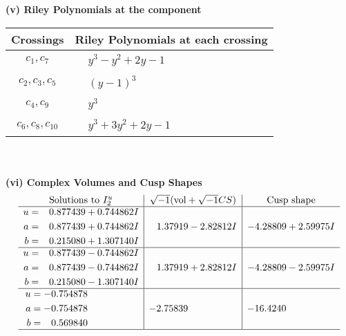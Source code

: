 \documentclass[1p]{elsarticle_modified}
\theoremstyle{definition}
\newcommand{\I}{\sqrt{-1}}
\begin{document}
\flushleft \textbf{(v) Riley Polynomials at the component}\newline \\
\begin{tabular}{m{50pt}|m{274pt}}
Crossings & \hspace{64pt}Riley Polynomials at each crossing \\
\hline $$\begin{aligned}c_{1},c_{7}\end{aligned}$$&$\begin{aligned}
&y^3- y^2+2 y-1
\end{aligned}$\\
\hline $$\begin{aligned}c_{2},c_{3},c_{5}\end{aligned}$$&$\begin{aligned}
&(y-1)^3
\end{aligned}$\\
\hline $$\begin{aligned}c_{4},c_{9}\end{aligned}$$&$\begin{aligned}
&y^3
\end{aligned}$\\
\hline $$\begin{aligned}c_{6},c_{8},c_{10}\end{aligned}$$&$\begin{aligned}
&y^3+3 y^2+2 y-1
\end{aligned}$\\
\hline
\end{tabular}\\~\\
\newpage\flushleft \textbf{(vi) Complex Volumes and Cusp Shapes}
$$\begin{array}{c|c|c}  
\text{Solutions to }I^u_{2}& \I (\text{vol} + \sqrt{-1}CS) & \text{Cusp shape}\\
 \hline 
\begin{aligned}
u &= \phantom{-}0.877439 + 0.744862 I \\
a &= \phantom{-}0.877439 + 0.744862 I \\
b &= \phantom{-}0.215080 + 1.307140 I\end{aligned}
 & \phantom{-}1.37919 - 2.82812 I & -4.28809 + 2.59975 I \\ \hline\begin{aligned}
u &= \phantom{-}0.877439 - 0.744862 I \\
a &= \phantom{-}0.877439 - 0.744862 I \\
b &= \phantom{-}0.215080 - 1.307140 I\end{aligned}
 & \phantom{-}1.37919 + 2.82812 I & -4.28809 - 2.59975 I \\ \hline\begin{aligned}
u &= -0.754878\phantom{ +0.000000I} \\
a &= -0.754878\phantom{ +0.000000I} \\
b &= \phantom{-}0.569840\phantom{ +0.000000I}\end{aligned}
 & -2.75839\phantom{ +0.000000I} & -16.4240\phantom{ +0.000000I}\\
 \hline 
 \end{array}$$\newpage
\end{document}
